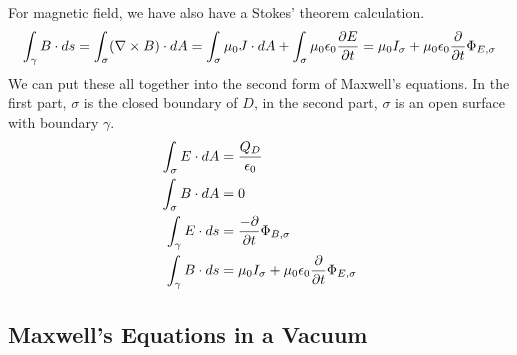 \documentclass[fleqn,letterpaper]{report}
\begin{document}
For magnetic field, we have also have a Stokes' theorem
calculation.
\begin{equation*}
\int_\gamma B \cdot ds = \int_{\sigma} (\nabla \times B) \cdot
dA = \int_\sigma \mu_0 J \cdot dA + \int_\sigma \mu_0
\epsilon_0 \frac{\partial E}{\partial t} = \mu_0 I_\sigma + \mu_0
\epsilon_0 \frac{\partial}{\partial t} \Phi_{E, \sigma}
\end{equation*}
We can put these all together into the second form of
Maxwell's equations. In the first part, $\sigma$ is the closed
boundary of $D$, in the second part, $\sigma$ is an open
surface with boundary $\gamma$.
\begin{align*}
\int_\sigma E \cdot dA & = \frac{Q_D}{\epsilon_0} \\
\int_\sigma B \cdot dA & = 0 \\
\int_\gamma E \cdot ds & = \frac{-\partial}{\partial t}
\Phi_{B,\sigma} \\
\int_\gamma B \cdot ds & = \mu_0 I_{\sigma} + \mu_0 \epsilon_0
\frac{\partial}{\partial t} \Phi_{E,\sigma} \\
\end{align*}

\subsection{Maxwell's Equations in a Vacuum}
\label{maxwell-vacuum}
\end{document}
